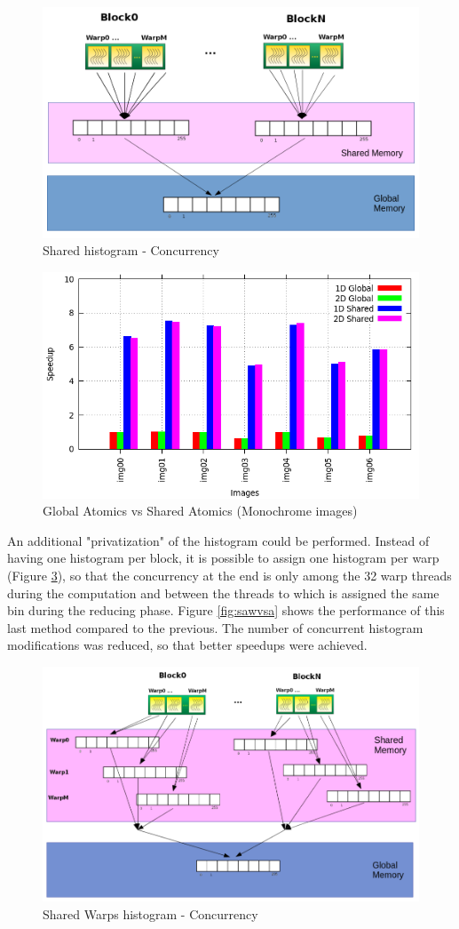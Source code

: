 \documentclass[a4paper]{article}
\begin{document}
\begin{figure}[!ht]
    \centering
    \includegraphics[width=0.7\linewidth]{shared_histo}
    \caption{Shared histogram - Concurrency}
    \label{fig:shsh}
\end{figure}
\FloatBarrier

\begin{figure}[!ht]
    \centering
    \includegraphics[width=0.7\linewidth]{res/new/histogram_confronto}
    \caption{Global Atomics vs Shared Atomics (Monochrome images)}
    \label{fig:gavsa}
\end{figure}
\FloatBarrier

An additional "privatization" of the histogram could be performed. Instead of having one histogram per block, it is possible to assign one histogram per warp (Figure \ref{fig:whwh}), so that the concurrency at the end is only among the 32 warp threads during the computation and between the threads to which is assigned the same bin during the reducing phase. Figure \ref{fig:sawvsa} shows the performance of this last method compared to the previous. The number of concurrent histogram modifications was reduced, so that better speedups were achieved.

\begin{figure}[!ht]
    \centering
    \includegraphics[width=0.9\linewidth]{histo_warp}
    \caption{Shared Warps histogram - Concurrency}
    \label{fig:whwh}
\end{figure}
\FloatBarrier
\end{document}
